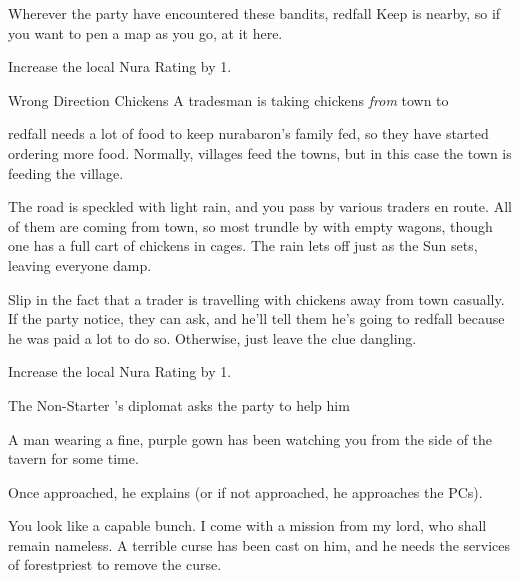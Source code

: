 \begin{multicols}{2}
Wherever the party have encountered these bandits, \gls{redfall} Keep is nearby, so if you want to pen a map as you go, at it here.

Increase the local Nura Rating by 1.

{\N Wrong Direction Chickens}%
{A tradesman is taking chickens \emph{from} town to }%

\Gls{redfall} needs a lot of food to keep \gls{nurabaron}'s family fed, so they have started ordering more food.
Normally, villages feed the towns, but in this case the town is feeding the village.

\begin{boxtext}

  The road is speckled with light rain, and you pass by various traders en route.
  All of them are coming from town, so most trundle by with empty wagons, though one has a full cart of chickens in cages.
  The rain lets off just as the Sun sets, leaving everyone damp.

\end{boxtext}

Slip in the fact that a trader is travelling with chickens away from \gls{town} casually.
If the party notice, they can ask, and he'll tell them he's going to \gls{redfall} because he was paid a lot to do so.
Otherwise, just leave the clue dangling.

Increase the local Nura Rating by 1.

\resumecontents[Town]

{The Non-Starter}%
{'s diplomat asks the party to help him}%
\label{nonstarter}

\stopcontents[Town]

\begin{boxtext}

  A man wearing a fine, purple gown has been watching you from the side of the tavern for some time.

\end{boxtext}

Once approached, he explains (or if not approached, he approaches the PCs).

\begin{speechtext}

  You look like a capable bunch.
  I come with a mission from my lord, who shall remain nameless.
  A terrible curse has been cast on him, and he needs the services of \gls{forestpriest} to remove the curse.


\end{speechtext}
\end{multicols}
